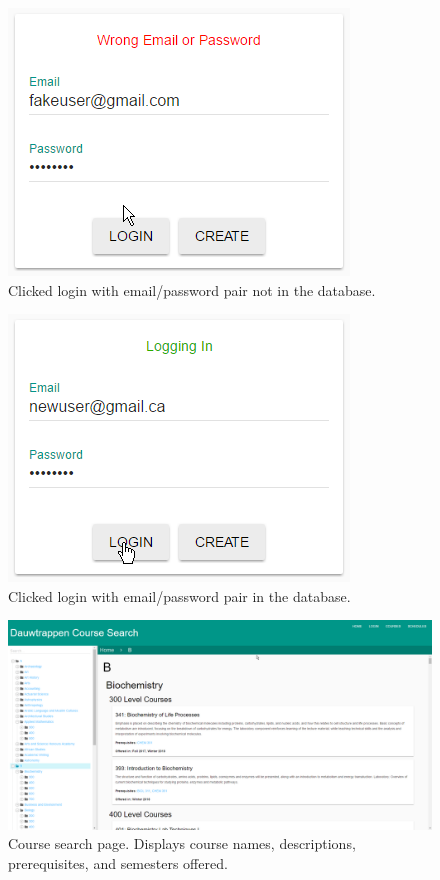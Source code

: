 \documentclass[twoside=false,a4paper,11pt]{article}
\theoremstyle{mytheor}
\begin{document}
\begin{figure}[h!]
	\includegraphics{loginBadAccount.png}
	\caption{Clicked login with email/password pair not in the database.}
\end{figure}
\begin{figure}[h!]
	\includegraphics{login.png}
	\caption{Clicked login with email/password pair in the database.}
\end{figure}

\begin{figure}[h!]
	\includegraphics[width=\textwidth]{courses.png}
	\caption{Course search page. Displays course names, descriptions, prerequisites, and semesters offered.}
\end{figure}
\end{document}
